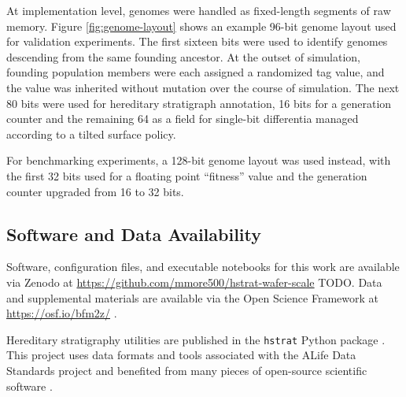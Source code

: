 
At implementation level, genomes were handled as fixed-length segments of raw memory.
Figure \ref{fig:genome-layout} shows an example 96-bit genome layout used for validation experiments.
The first sixteen bits were used to identify genomes descending from the same founding ancestor.
At the outset of simulation, founding population members were each assigned a randomized tag value, and the value was inherited without mutation over the course of simulation.
The next 80 bits were used for hereditary stratigraph annotation, 16 bits for a generation counter and the remaining 64 as a field for single-bit differentia managed according to a tilted surface policy.

For benchmarking experiments, a 128-bit genome layout was used instead, with the first 32 bits used for a floating point ``fitness'' value and the generation counter upgraded from 16 to 32 bits.

\subsection{Software and Data Availability}

Software, configuration files, and executable notebooks for this work are available via Zenodo at \url{https://github.com/mmore500/hstrat-wafer-scale} TODO.
Data and supplemental materials are available via the Open Science Framework at \url{https://osf.io/bfm2z/} \citep{foster2017open}.

Hereditary stratigraphy utilities are published in the \texttt{hstrat} Python package \citep{moreno2022hstrat}.
This project uses data formats and tools associated with the ALife Data Standards project \citep{lalejini2019data} and benefited from many pieces of open-source scientific software \citep{huerta2016ete,2020SciPy-NMeth,harris2020array,reback2020pandas,mckinney-proc-scipy-2010,cock2009biopython,waskom2021seaborn,hunter2007matplotlib,moreno2024apc,moreno2024pecking,moreno2024hsurf,moreno2024wse,dolson2024phylotrackpy}.

